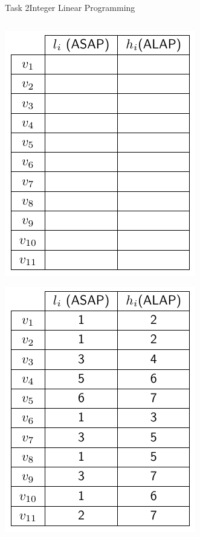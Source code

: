 \begin{frame}[allowframebreaks]{Task 2}{Integer Linear Programming}
\begin{tasknoinc}
\begin{columns}
\begin{column}{.5\textwidth}
\begin{itemize}
        \end{itemize}
      \end{column}
    \end{columns}
  \end{tasknoinc}
  \begin{solutionnoinc}
    \centering
    \includegraphics[height=0.6\paperheight]{./figures/task2_earliest_and_latest_starting_times_empty.png}
  \end{solutionnoinc}
  \begin{solution}
    \centering
    \includegraphics[height=0.6\paperheight]{./figures/task2_earliest_and_latest_starting_times.png}

\end{solution}
\end{frame}
